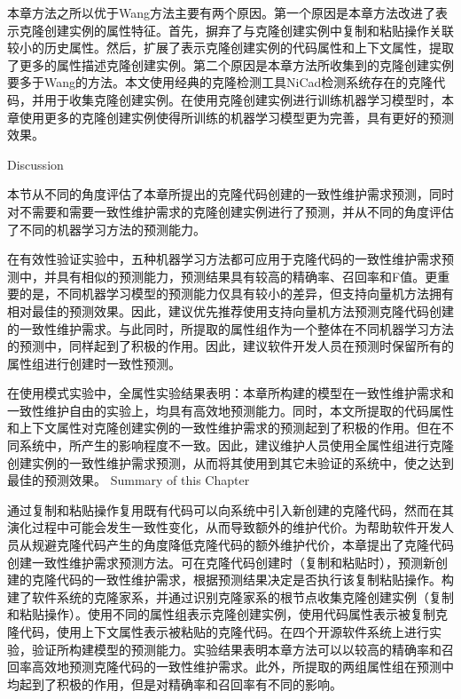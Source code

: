 本章方法之所以优于Wang方法主要有两个原因。第一个原因是本章方法改进了表示克隆创建实例的属性特征。首先，摒弃了与克隆创建实例中复制和粘贴操作关联较小的历史属性。然后，扩展了表示克隆创建实例的代码属性和上下文属性，提取了更多的属性描述克隆创建实例。第二个原因是本章方法所收集到的克隆创建实例要多于Wang的方法。本文使用经典的克隆检测工具NiCad检测系统存在的克隆代码，并用于收集克隆创建实例。在使用克隆创建实例进行训练机器学习模型时，本章使用更多的克隆创建实例使得所训练的机器学习模型更为完善，具有更好的预测效果。

{Discussion}

本节从不同的角度评估了本章所提出的克隆代码创建的一致性维护需求预测，同时对不需要和需要一致性维护需求的克隆创建实例进行了预测，并从不同的角度评估了不同的机器学习方法的预测能力。

在有效性验证实验中，五种机器学习方法都可应用于克隆代码的一致性维护需求预测中，并具有相似的预测能力，预测结果具有较高的精确率、召回率和F值。更重要的是，不同机器学习模型的预测能力仅具有较小的差异，但支持向量机方法拥有相对最佳的预测效果。因此，建议优先推荐使用支持向量机方法预测克隆代码创建的一致性维护需求。与此同时，所提取的属性组作为一个整体在不同机器学习方法的预测中，同样起到了积极的作用。因此，建议软件开发人员在预测时保留所有的属性组进行创建时一致性预测。

在使用模式实验中，全属性实验结果表明：本章所构建的模型在一致性维护需求和一致性维护自由的实验上，均具有高效地预测能力。同时，本文所提取的代码属性和上下文属性对克隆创建实例的一致性维护需求的预测起到了积极的作用。但在不同系统中，所产生的影响程度不一致。因此，建议维护人员使用全属性组进行克隆创建实例的一致性维护需求预测，从而将其使用到其它未验证的系统中，使之达到最佳的预测效果。
{Summary of this Chapter}

通过复制和粘贴操作复用既有代码可以向系统中引入新创建的克隆代码，然而在其演化过程中可能会发生一致性变化，从而导致额外的维护代价。为帮助软件开发人员从规避克隆代码产生的角度降低克隆代码的额外维护代价，本章提出了克隆代码创建一致性维护需求预测方法。可在克隆代码创建时（复制和粘贴时），预测新创建的克隆代码的一致性维护需求，根据预测结果决定是否执行该复制粘贴操作。构建了软件系统的克隆家系，并通过识别克隆家系的根节点收集克隆创建实例（复制和粘贴操作）。使用不同的属性组表示克隆创建实例，使用代码属性表示被复制克隆代码，使用上下文属性表示被粘贴的克隆代码。在四个开源软件系统上进行实验，验证所构建模型的预测能力。实验结果表明本章方法可以以较高的精确率和召回率高效地预测克隆代码的一致性维护需求。此外，所提取的两组属性组在预测中均起到了积极的作用，但是对精确率和召回率有不同的影响。

